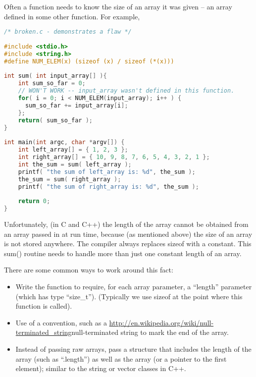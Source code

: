Often a function needs to know the size of an array it was given -- an array
defined in some other function.
For example,
\lstset{basicstyle=\scriptsize, numbers=left, captionpos=b, tabsize=4}
\begin{lstlisting}[caption=Section \thesection listing \arabic{pntcnt},language={C},
breaklines=true,xleftmargin=15pt,label=lst:section\thesection listing\arabic{pntcnt}]
/* broken.c - demonstrates a flaw */
 
#include <stdio.h>
#include <string.h>
#define NUM_ELEM(x) (sizeof (x) / sizeof (*(x)))
 
int sum( int input_array[] ){
	int sum_so_far = 0;
	// WON'T WORK -- input_array wasn't defined in this function.
	for( i = 0; i < NUM_ELEM(input_array); i++ ) {
	  sum_so_far += input_array[i];
	};
	return( sum_so_far );
}
 
int main(int argc, char *argv[]) {
	int left_array[] = { 1, 2, 3 };
	int right_array[] = { 10, 9, 8, 7, 6, 5, 4, 3, 2, 1 };
	int the_sum = sum( left_array );
	printf( "the sum of left_array is: %d", the_sum );
	the_sum = sum( right_array );
	printf( "the sum of right_array is: %d", the_sum );
	
	return 0;
}
\end{lstlisting}

Unfortunately, (in C and C++) the length of the array cannot be obtained from
an array passed in at run time, because (as mentioned above) the size of an
array is not stored anywhere.  The compiler always replaces sizeof with a
constant.  This sum() routine needs to handle more than just one constant
length of an array.

There are some common ways to work around this fact:
\begin{itemize}
	\item Write the function to require, for each array parameter, a ``length''
parameter (which has type ``size\_t''). (Typically we use sizeof at the point
where this function is called).
	\item Use of a convention, such as a
\url{http://en.wikipedia.org/wiki/null-terminated_string}{null-terminated
string} to mark the end of the array.
	\item Instead of passing raw arrays, pass a structure that includes the
length of the array (such as ``.length'') as well as the array (or a pointer to
the first element); similar to the string or vector classes in C++.
\end{itemize}

